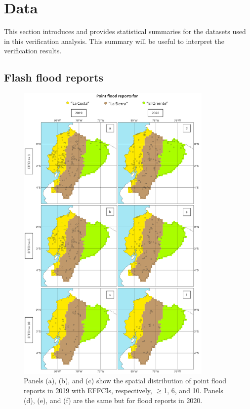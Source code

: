 \documentclass[techmemo]{ecmwfrep}%
\begin{document}

\section{Data}
\label{sec:Data}

This section introduces and provides statistical summaries for the datasets used in this verification analysis. This summary will be useful to interpret the verification results.  

\subsection{Flash flood reports}
\label{sec:Data_ReportsFF}

\begin{figure}
\centering
\includegraphics[width=0.85\textwidth]{Figures/02_DATA_PointFR_2019_2020.png}
\caption{Panels (a), (b), and (c) show the spatial distribution of point flood reports in 2019 with EFFCIs, respectively, $\geq$1, 6, and 10. Panels (d), (e), and (f) are the same but for flood reports in 2020.}
\label{fig:PointFR_Maps}
\end{figure}
\end{document}
